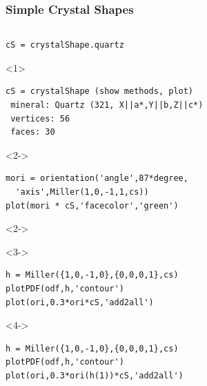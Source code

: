 \documentclass[compress]{beamer}
\begin{document}
\begin{frame}[fragile]
  \frametitle{Simple Crystal Shapes}

  \begin{columns}
    \begin{column}{8.5cm}
      \vspace{-0.5cm}
      \begin{overlayarea}{\textwidth}{8cm}

  \begin{lstlisting}[style=input]
cS = crystalShape.quartz
  \end{lstlisting}
 \begin{onlyenv}<1>
    \vspace{-.3cm}
    \begin{lstlisting}[style=output]
cS = crystalShape (show methods, plot)
 mineral: Quartz (321, X||a*,Y||b,Z||c*)
 vertices: 56
 faces: 30
    \end{lstlisting}
  \end{onlyenv}
  \begin{onlyenv}<2->
    \begin{lstlisting}[style=input]
mori = orientation('angle',87*degree,
  'axis',Miller(1,0,-1,1,cs))
plot(mori * cS,'facecolor','green')
  \end{lstlisting}
 \end{onlyenv}
 \begin{onlyenv}<2->
 \end{onlyenv}

   \begin{onlyenv}<3->
     \begin{lstlisting}[style=input]
h = Miller({1,0,-1,0},{0,0,0,1},cs)
plotPDF(odf,h,'contour')
plot(ori,0.3*ori*cS,'add2all')
  \end{lstlisting}
 \end{onlyenv}

   \begin{onlyenv}<4->
     \begin{lstlisting}[style=input]
h = Miller({1,0,-1,0},{0,0,0,1},cs)
plotPDF(odf,h,'contour')
plot(ori,0.3*ori(h(1))*cS,'add2all')
  \end{lstlisting}
 \end{onlyenv}


\end{overlayarea}
\end{column}


\end{columns}
\end{frame}
\end{document}

